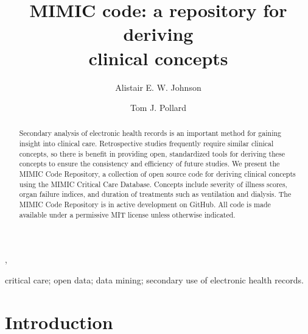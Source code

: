 \documentclass{elsart}
\begin{document}
\begin{frontmatter}
\title{MIMIC code: a repository for deriving\\ clinical concepts}

\author[Cambridge]{Alistair E. W. Johnson},
\author[Cambridge]{Tom J. Pollard}
\address[Cambridge]{Massachusetts institute of Technology, Cambridge}

          
\begin{keyword}
critical care; open data; data mining; secondary use of electronic health records.
\end{keyword}


\begin{abstract}
Secondary analysis of electronic health records is an important method for gaining insight into clinical care. Retrospective studies frequently require similar clinical concepts, so there is benefit in providing open, standardized tools for deriving these concepts to ensure the consistency and efficiency of future studies.
We present the MIMIC Code Repository, a collection of open source code for deriving clinical concepts using the MIMIC Critical Care Database. Concepts include severity of illness scores, organ failure indices, and duration of treatments such as ventilation and dialysis.
The MIMIC Code Repository is in active development on GitHub. All code is made available under a permissive MIT license unless otherwise indicated.\\
\end{abstract}

\end{frontmatter}


\section{Introduction}

\end{document}
